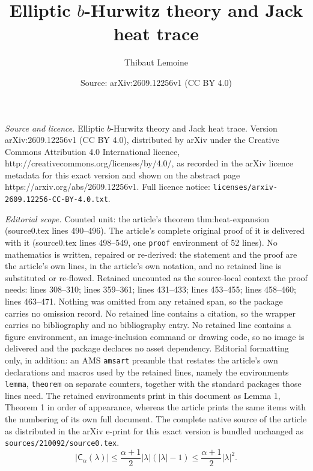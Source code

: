 \documentclass[10pt,a4paper]{amsart}
\title{Elliptic $b$-Hurwitz theory and Jack heat trace}
\author{Thibaut Lemoine}
\date{Source: arXiv:2609.12256v1 (CC BY 4.0)}
\newcommand\cA{{\mathsf C}}
\begin{document}
\maketitle

\noindent\emph{Source and licence.} Elliptic $b$-Hurwitz theory and Jack heat trace. Version arXiv:2609.12256v1 (CC BY 4.0), distributed by arXiv under the Creative Commons Attribution 4.0 International licence, http://creativecommons.org/licenses/by/4.0/, as recorded in the arXiv licence metadata for this exact version and shown on the abstract page https://arxiv.org/abs/2609.12256v1. Full licence notice: \texttt{licenses/arxiv-2609.12256-CC-BY-4.0.txt}.\par\smallskip

\noindent\textit{Editorial scope.} Counted unit: the article's theorem thm:heat-expansion (source0.tex lines 490--496). The article's complete original proof of it is delivered with it (source0.tex lines 498--549, one \texttt{proof} environment of 52 lines). No mathematics is written, repaired or re-derived: the statement and the proof are the article's own lines, in the article's own notation, and no retained line is substituted or re-flowed.  Retained uncounted as the source-local context the proof needs: lines 308--310; lines 359--361; lines 431--433; lines 453--455; lines 458--460; lines 463--471.  Nothing was omitted from any retained span, so the package carries no omission record.  No retained line contains a citation, so the wrapper carries no bibliography and no bibliography entry.  No retained line contains a figure environment, an image-inclusion command or drawing code, so no image is delivered and the package declares no asset dependency.  Editorial formatting only, in addition: an AMS \texttt{amsart} preamble that restates the article's own declarations and macros used by the retained lines, namely the environments \texttt{lemma}, \texttt{theorem} on separate counters, together with the standard packages those lines need.  The retained environments print in this document as Lemma 1, Theorem 1 in order of appearance, whereas the article prints the same items with the numbering of its own full document.  The complete native source of the article as distributed in the arXiv e-print for this exact version is bundled unchanged as \texttt{sources/210092/source0.tex}.
\begin{equation}\label{eq:content-crude}
|\cA_\alpha(\lambda)|\leq \frac{\alpha+1}{2}|\lambda|(|\lambda|-1)\leq \frac{\alpha+1}{2}|\lambda|^2.
\end{equation}
\end{document}
